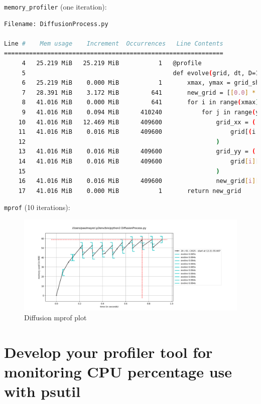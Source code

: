 \documentclass[a4paper,12pt]{article}
\begin{document}
\verb|memory_profiler| (one iteration):
\begin{lstlisting}[language=bash,basicstyle=\tiny\ttfamily]
Filename: DiffusionProcess.py

Line #    Mem usage    Increment  Occurrences   Line Contents
=============================================================
     4   25.219 MiB   25.219 MiB           1   @profile
     5                                         def evolve(grid, dt, D=1.0):
     6   25.219 MiB    0.000 MiB           1       xmax, ymax = grid_shape
     7   28.391 MiB    3.172 MiB         641       new_grid = [[0.0] * ymax for x in range(xmax)]
     8   41.016 MiB    0.000 MiB         641       for i in range(xmax):
     9   41.016 MiB    0.094 MiB      410240           for j in range(ymax):
    10   41.016 MiB   12.469 MiB      409600               grid_xx = (
    11   41.016 MiB    0.016 MiB      409600                   grid[(i + 1) % xmax][j] + grid[(i - 1) % xmax][j] - 2.0 * grid[i][j]
    12                                                     )
    13   41.016 MiB    0.016 MiB      409600               grid_yy = (
    14   41.016 MiB    0.016 MiB      409600                   grid[i][(j + 1) % ymax] + grid[i][(j - 1) % ymax] - 2.0 * grid[i][j]
    15                                                     )
    16   41.016 MiB    0.016 MiB      409600               new_grid[i][j] = grid[i][j] + D * (grid_xx + grid_yy) * dt
    17   41.016 MiB    0.000 MiB           1       return new_grid
\end{lstlisting}\vspace{1em}
\verb|mprof| (10 iterations):
\begin{figure}[h!]
  \centering
  \includegraphics[width=\textwidth]{images/diffusion_mprofile}
  \caption{Diffusion mprof plot}
  \label{fig:diffusion-mprof}
\end{figure}

\newpage
\section{Develop your profiler tool for monitoring CPU percentage use with psutil}


\end{document}
